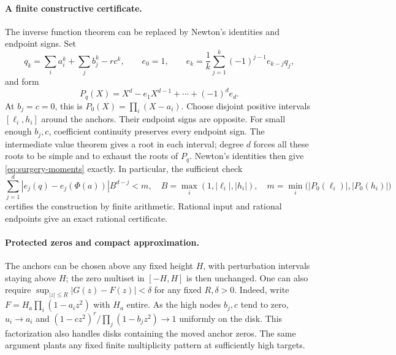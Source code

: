 \paragraph{A finite constructive certificate.}
The inverse function theorem can be replaced by Newton's identities and
endpoint signs. Set
\[
 q_k=\sum_i a_i^k+\sum_jb_j^k-r c^k,\qquad
 e_0=1,\qquad e_k=\frac1k\sum_{j=1}^k(-1)^{j-1}e_{k-j}q_j,
\]
and form
\[
 P_q(X)=X^d-e_1X^{d-1}+\cdots+(-1)^d e_d.
\]
At \(b_j=c=0\), this is \(P_0(X)=\prod_i(X-a_i)\). Choose disjoint
positive intervals \([\ell_i,h_i]\) around the anchors. Their endpoint
signs are opposite. For small enough \(b_j,c\), coefficient continuity
preserves every endpoint sign. The intermediate value theorem gives a root
in each interval; degree \(d\) forces all these roots to be simple and to
exhaust the roots of \(P_q\). Newton's identities then give
\eqref{eq:surgery-moments} exactly. In particular, the sufficient check
\[
 \sum_{j=1}^d|e_j(q)-e_j(\Phi(a))|B^{d-j}<m,
 \quad
 B=\max_i(1,|\ell_i|,|h_i|),\quad
 m=\min_i\bigl(|P_0(\ell_i)|,|P_0(h_i)|\bigr)
\]
certifies the construction by finite arithmetic. Rational input and rational
endpoints give an exact rational certificate.

\paragraph{Protected zeros and compact approximation.}
The anchors can be chosen above any fixed height \(H\), with perturbation
intervals staying above \(H\); the zero multiset in \([-H,H]\) is then
unchanged. One can also require \(\sup_{|z|\le R}|G(z)-F(z)|<\delta\) for
any fixed \(R,\delta>0\). Indeed, write
\(F=H_a\prod_i(1-a_i z^2)\) with \(H_a\) entire. As the high nodes
\(b_j,c\) tend to zero, \(u_i\to a_i\) and
\((1-cz^2)^r/\prod_j(1-b_jz^2)\to1\) uniformly on the disk. This
factorization also handles disks containing the moved anchor zeros.
The same argument plants any fixed finite multiplicity pattern at
sufficiently high targets.

